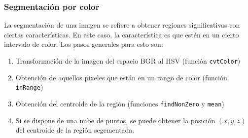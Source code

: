 \begin{frame}\frametitle{Segmentación por color}
  La segmentación de una imagen se refiere a obtener regiones significativas con ciertas características. En este caso, la característica es que estén en un cierto intervalo de color. Los pasos generales para esto son:
  \begin{enumerate}
  \item Transformación de la imagen del espacio BGR al HSV (función \texttt{cvtColor})
  \item Obtención de aquellos pixeles que están en un rango de color (función \texttt{inRange})
  \item Obtención del centroide de la región (funciones \texttt{findNonZero} y \texttt{mean})
  \item Si se dispone de una nube de puntos, se puede obtener la posición $(x,y,z)$ del centroide de la región segementada. 
  \end{enumerate}
\end{frame}

